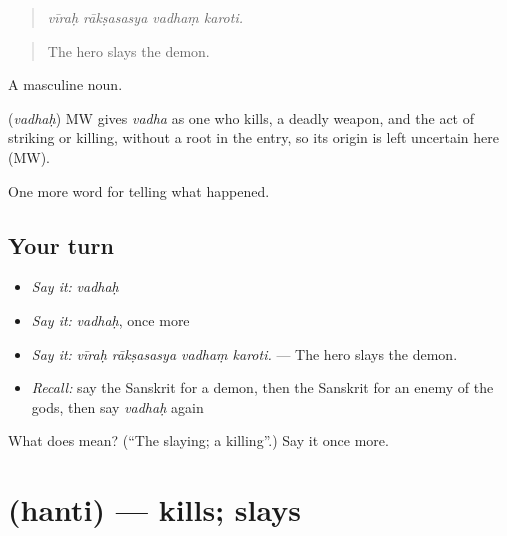\begin{quote}
   
\end{quote}

\begin{quote}
\emph{vīraḥ rākṣasasya vadhaṃ karoti.}
\end{quote}

\begin{quote}
The hero slays the demon.
\end{quote}

A masculine noun.

\begin{cousinweb}
\textbf{} (\emph{vadhaḥ}) MW gives \emph{vadha} as one who kills, a deadly weapon, and the act of striking or killing, without a root in the entry, so its origin is left uncertain here (MW).
\end{cousinweb}

\begin{grammarlens}[title={What you've built}]
One more word for telling what happened.
\end{grammarlens}

\subsection*{Your turn}
\begin{itemize}
\raggedright
  \item \emph{Say it:} \emph{vadhaḥ}
  \item \emph{Say it:} \emph{vadhaḥ}, once more
  \item \emph{Say it:} \emph{vīraḥ rākṣasasya vadhaṃ karoti.} — The hero slays the demon.
  \item \emph{Recall:} say the Sanskrit for a demon, then the Sanskrit for an enemy of the gods, then say \emph{vadhaḥ} again
\end{itemize}

\begin{tcolorbox}[breakable,colback=teal!4,colframe=teal!35!black,title={Before you move on}]
What does  mean? (\textquotedblleft{}The slaying; a killing\textquotedblright{}.) Say it once more.
\end{tcolorbox}
\section[\texorpdfstring{\sk{हन्ति} (hanti)}{हन्ति (hanti)}]{ (hanti) — kills; slays}

\label{lesson:SA-C334-hanti}



